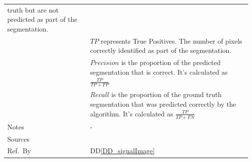 \documentclass[12pt]{article}
\newcommand{\colAwidth}{0.13\textwidth}
\newcommand{\colBwidth}{0.82\textwidth}
\newcommand{\ddref}[1]{DD\ref{#1}}
\begin{document}
\begin{minipage}{\textwidth}
\begin{tabular}{| p{\colAwidth} | p{\colBwidth}|}
    truth but are not predicted as part of the segmentation.                                                                                              \\
             & $TP$ represents True Positives. The number of pixels correctly identified as part of the segmentation.                                     \\
             & $Precision$ is the proportion of the predicted segmentation that is correct. It's calculated as
    $\frac{TP}{TP + FP }$                                                                                                                                 \\
             & $Recall$ is the proportion of the ground truth segmentation that was predicted correctly by the algorithm.
    It's calculated as $\frac{TP}{TP + FN }$                                                                                                              \\
    \hline
    Notes    & -                                                                                                                                          \\
    \hline
    Sources  & \cite{fedorov2017end}                                                                                                                      \\
    \hline
    Ref.\ By & \ddref{DD_signalImage}                                                                                                                     \\
    \hline
  \end{tabular}
\end{minipage}\\
\end{document}
